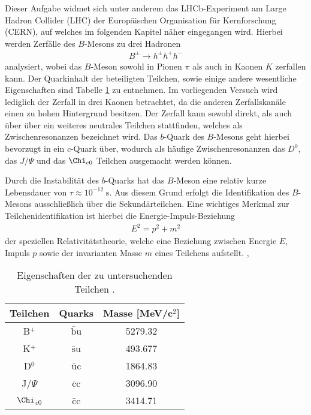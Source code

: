 Dieser Aufgabe widmet sich unter anderem das LHCb-Experiment am Large Hadron Collider (LHC) der Europäischen Organisation für Kernforschung (CERN), auf welches im folgenden Kapitel näher eingegangen wird. Hierbei werden Zerfälle des $B$-Mesons zu drei Hadronen 
\begin{align*}
    B^{\pm} \rightarrow h^{\pm} h^{+} h^{-}
\end{align*}
analysiert, wobei das $B$-Meson sowohl in Pionen $\pi$ als auch in Kaonen $K$ zerfallen kann. Der Quarkinhalt der beteiligten Teilchen, sowie einige andere wesentliche Eigenschaften sind Tabelle \ref{tab:quarks} zu entnehmen. Im vorliegenden Versuch wird lediglich der Zerfall in drei Kaonen betrachtet, da die anderen Zerfallskanäle einen zu hohen Hintergrund besitzen. Der Zerfall kann sowohl direkt, als auch über über ein weiteres neutrales Teilchen stattfinden, welches als Zwischenresonanzen bezeichnet wird. Das $b$-Quark des $B$-Mesons geht hierbei bevorzugt in ein $c$-Quark über, wodurch als häufige Zwischenresonanzen das $D^0$, das $J/\Psi$ und das $\Chi_{c0}$ Teilchen ausgemacht werden können.

Durch die Instabilität des $b$-Quarks hat das $B$-Meson eine relativ kurze Lebensdauer von $\tau \approx 10^{-12}\;\si{\second}$. Aus diesem Grund erfolgt die Identifikation des $B$-Mesons ausschließlich über die Sekundärteilchen. Eine wichtiges Merkmal zur Teilchenidentifikation ist hierbei die Energie-Impuls-Beziehung 
\begin{align}
    E^2 = p^2 + m^2
    \label{eq:Epm}
\end{align}
der speziellen Relativitätstheorie, welche eine Beziehung zwischen Energie $E$, Impuls $p$ sowie der invarianten Masse $m$ eines Teilchens aufstellt. \cite{anleitung}, \cite{lhcbpublic}

\begin{table}[ht]
    \centering
    \caption{Eigenschaften der zu untersuchenden Teilchen \cite{pdg}.}
    \label{tab:quarks}
    \begin{tabular} { c c c }
    \toprule
    {Teilchen} & {Quarks} & {Masse [MeV/c$^2$]} \\
    \midrule
      B$^{+}$ & $\bar{\mathrm{b}}$u & 5279.32\\
      K$^{+}$ & $\bar{\mathrm{s}}$u & 493.677 \\
      D$^0$ & $\bar{\mathrm{u}}$c & 1864.83 \\
      J/$\Psi$ & $\bar{\mathrm{c}}$c & 3096.90\\
      $\Chi$$_{c0}$ & $\bar{\mathrm{c}}$c & 3414.71\\
    \bottomrule
    \end{tabular}
    \end{table}

